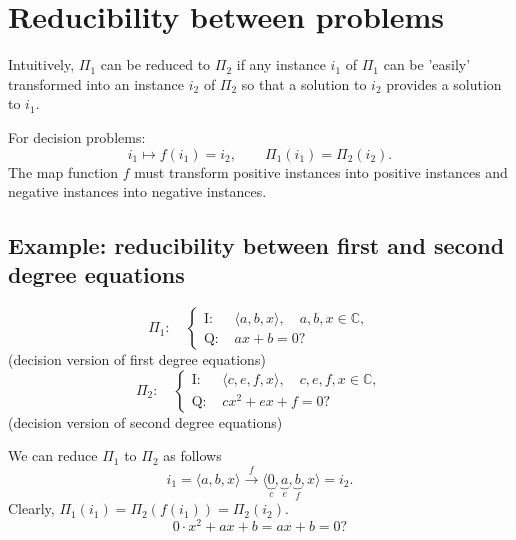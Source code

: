 
\section{Reducibility between problems}
Intuitively, $\Pi_1$ can be reduced to $\Pi_2$ if any instance $i_1$ of $\Pi_1$ can be 'easily' transformed into an instance $i_2$ of $\Pi_2$ so that a solution to $i_2$ provides a solution to $i_1$.

For decision problems:
\[
i_1\longmapsto f(i_1)=i_2,\qquad\Pi_1(i_1)=\Pi_2(i_2).
\]
The map function $f$ must transform positive instances into positive instances and negative instances into negative instances.

\subsection{Example: reducibility between first and second degree equations}
\[
\Pi_1:\quad\left\{\begin{aligned}
\text{I: }&\langle a,b,x\rangle,\quad a,b,x\in\mathbb C,\\
\text{Q: }&ax+b=0?
\end{aligned}\right.
\]
(decision version of first degree equations)
\[
\Pi_2:\quad\left\{\begin{aligned}
\text{I: }&\langle c,e,f,x\rangle,\quad c,e,f,x\in\mathbb C,\\
\text{Q: }&cx^2+ex+f=0?
\end{aligned}\right.
\]
(decision version of second degree equations)

We can reduce $\Pi_1$ to $\Pi_2$ as follows
\[
i_1=\langle a,b,x\rangle\xrightarrow{f}\langle\underbrace{0}_{c},\underbrace{a}_{e},\underbrace{b}_{f},x\rangle=i_2.
\]
Clearly, $\Pi_1(i_1)=\Pi_2(f(i_1))=\Pi_2(i_2)$.
\[
0\cdot x^2+ax+b=ax+b=0?
\]

